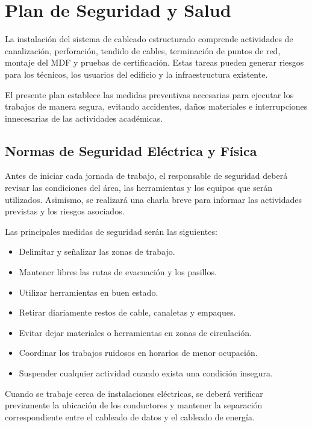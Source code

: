 
\chapter{Plan de Seguridad y Salud}
\label{chap:plan_seguridad}

La instalación del sistema de cableado estructurado comprende actividades de canalización, perforación, tendido de cables, terminación de puntos de red, montaje del MDF y pruebas de certificación. Estas tareas pueden generar riesgos para los técnicos, los usuarios del edificio y la infraestructura existente.

El presente plan establece las medidas preventivas necesarias para ejecutar los trabajos de manera segura, evitando accidentes, daños materiales e interrupciones innecesarias de las actividades académicas.

\section{Normas de Seguridad Eléctrica y Física}

Antes de iniciar cada jornada de trabajo, el responsable de seguridad deberá revisar las condiciones del área, las herramientas y los equipos que serán utilizados. Asimismo, se realizará una charla breve para informar las actividades previstas y los riesgos asociados.

Las principales medidas de seguridad serán las siguientes:

\begin{itemize}
    \item Delimitar y señalizar las zonas de trabajo.
    \item Mantener libres las rutas de evacuación y los pasillos.
    \item Utilizar herramientas en buen estado.
    \item Retirar diariamente restos de cable, canaletas y empaques.
    \item Evitar dejar materiales o herramientas en zonas de circulación.
    \item Coordinar los trabajos ruidosos en horarios de menor ocupación.
    \item Suspender cualquier actividad cuando exista una condición insegura.
\end{itemize}

Cuando se trabaje cerca de instalaciones eléctricas, se deberá verificar previamente la ubicación de los conductores y mantener la separación correspondiente entre el cableado de datos y el cableado de energía.


